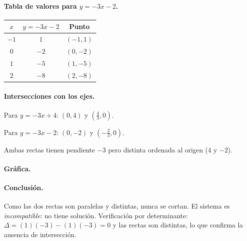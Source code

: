 \documentclass[12pt]{article}
\begin{document}
\paragraph{Tabla de valores para \(y=-3x-2\).}

\begin{center}
\begin{tabular}{ccc}
\toprule
\(x\) & \(y=-3x-2\) & Punto \\
\midrule
\(-1\) & \(1\) & \((-1,1)\) \\
\(0\)  & \(-2\) & \((0,-2)\) \\
\(1\)  & \(-5\) & \((1,-5)\) \\
\(2\)  & \(-8\) & \((2,-8)\) \\
\bottomrule
\end{tabular}
\end{center}

\paragraph{Intersecciones con los ejes.}

Para \(y=-3x+4\): \((0,4)\) y \(\left(\tfrac{4}{3},0\right)\).

Para \(y=-3x-2\): \((0,-2)\) y \(\left(-\tfrac{2}{3},0\right)\).

Ambas rectas tienen pendiente \(-3\) pero distinta ordenada al origen (\(4\) y \(-2\)).

\paragraph{Gráfica.}

\begin{center}
\end{center}

\paragraph{Conclusión.} Como las dos rectas son paralelas y distintas, nunca se cortan. El sistema es \emph{incompatible}: no tiene solución. Verificación por determinante: \(\Delta=(1)(-3)-(1)(-3)=0\) y las rectas son distintas, lo que confirma la ausencia de intersección.
\end{document}
